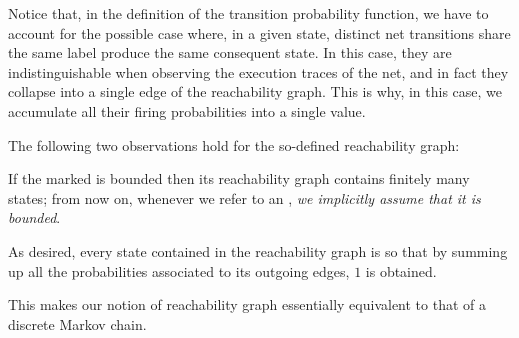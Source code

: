 Notice that, in the definition of the transition probability function, we have to account for the possible case where, in a given state, distinct net transitions share the same label produce the same consequent state. In this case, they are indistinguishable when observing the execution traces of the net, and in fact they collapse into a single edge of the reachability graph. This is why, in this case, we accumulate all their firing probabilities into a single value.

The following two observations hold for the so-defined reachability graph:
\begin{compactitem}
\item If the marked \uswn is bounded then its reachability graph contains finitely many states; from now on, whenever we refer to an \uswn, \emph{we implicitly assume that it is bounded}.
\item As desired, every state contained in the reachability graph is so that by summing up all the probabilities associated to its outgoing edges, $1$ is obtained.
\end{compactitem}
This makes our notion of reachability graph essentially equivalent to that of a discrete Markov chain.








